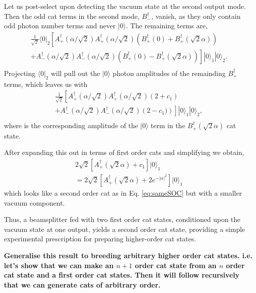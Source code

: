 \documentclass[aps,prl,twocolumn,amsmath,amssymb,nofootinbib,superscriptaddress]{revtex4}
\newcommand{\bra}[1]{\langle#1|}
\newcommand{\ket}[1]{|#1\rangle}
\newcommand{\keith}[1]{{\color{cyan}{#1}}}
\begin{document}
Let us post-select upon detecting the vacuum state at the second output mode. Then the odd cat terms in the second mode, $B_-^\dag$, vanish, as they only contain odd photon number terms and never $\ket{0}$. The remaining terms are,
\begin{eqnarray}
\frac{1}{\sqrt{2}}\bra{0}_2\left[A_+^\dag(\alpha/\sqrt{2}) A_+^\dag(\alpha/\sqrt{2}) \left(B_+^\dag(0)+  B_+^\dag(\sqrt{2}\alpha)\right) \right.\nonumber \\
\left.+ A_-^\dag(\alpha/\sqrt{2}) A_-^\dag(\alpha/\sqrt{2})\left(B_+^\dag(0)-  B_+^\dag(\sqrt{2}\alpha)\right)\right]\ket{0}_1 \ket{0}_2 .\nonumber \\
\end{eqnarray}
Projecting $\bra{0}_2$ will pull out the $\ket{0}$ photon amplitudes of the remainding $B_+^{\dag}$ terms, which leaves us with
\begin{eqnarray}
\frac{1}{\sqrt{2}}\left[A_+^\dag(\alpha/\sqrt{2}) A_+^\dag(\alpha/\sqrt{2}) \left(2+ c_1\right) \right.\nonumber \\
\left.+ A_-^\dag(\alpha/\sqrt{2}) A_-^\dag(\alpha/\sqrt{2})\left(2-  c_1)\right)\right]\ket{0}_1 \ket{0}_2,\nonumber \\
\end{eqnarray}
where \keith{$c_1\propto2e^{-|\alpha|^2}$} is the corresponding amplitude of the $\ket{0}$ term in the $B_+^\dag(\sqrt{2}\alpha)$ cat state. 

After expanding this out in terms of first order cats and simplifying we obtain,
\begin{eqnarray}
2\sqrt{2}\left[A_+^\dag(\sqrt{2}\alpha)+c_1\right]\ket{0}_1 \nonumber \\
=2\sqrt{2}\left[A_+^\dag(\sqrt{2}\alpha)+2e^{-|\alpha|^2}\right]\ket{0}_1
\end{eqnarray}
which looks like a second order cat as in Eq. \ref{eq:sameSOC} but with a smaller vacuum component.

Thus, a beamsplitter fed with two first order cat states, conditioned upon the vacuum state at one output, yields a second order cat state, providing a simple experimental prescription for preparing higher-order cat states.

\textbf{Generalise this result to breeding arbitrary higher order cat states. i.e. let's show that we can make an $n+1$ order cat state from an $n$ order cat state and a first order cat states. Then it will follow recursively that we can generate cats of arbitrary order.}



\end{document}
